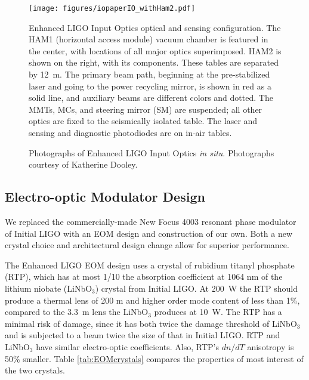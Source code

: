 \begin{figure}
\begin{centering}
\texttt{[image: figures/iopaperIO\_withHam2.pdf]}
\caption[Enhanced LIGO Input Optics optical and sensing
  configuration]{Enhanced LIGO Input Optics optical and sensing
  configuration. The HAM1 (horizontal access module) vacuum chamber is
  featured in the center, with locations of all major optics
  superimposed. HAM2 is shown on the right, with its components. These
  tables are separated by 12~m. The primary beam path, beginning at
  the pre-stabilized laser and going to the power recycling mirror, is
  shown in red as a solid line, and auxiliary beams are different
  colors and dotted. The MMTs, MCs, and steering mirror (SM) are
  suspended; all other optics are fixed to the seismically isolated
  table. The laser and sensing and diagnostic photodiodes are on
  in-air tables.}
\label{fig:IOschematic}
\end{centering}
\end{figure}

\begin{figure}
\begin{centering}
\caption[Photographs of Enhanced LIGO Input
Optics \emph{in situ}]{Photographs of Enhanced LIGO Input Optics
  \emph{in situ}. Photographs courtesy of Katherine Dooley.} %
\label{fig:IOpictures}
\end{centering}
\end{figure}


\subsection{Electro-optic Modulator Design}
We replaced the commercially-made New Focus 4003 resonant phase
modulator of Initial LIGO with an EOM design and construction of our
own. Both a new crystal choice and architectural design change allow
for superior performance.

The Enhanced LIGO EOM design uses a crystal of rubidium titanyl
phosphate (RTP), which has at most 1/10 the absorption coefficient at
1064 nm of the lithium niobate (LiNbO$_3$) crystal from Initial
LIGO. At 200~W the RTP should produce a thermal lens of 200 m and
higher order mode content of less than 1\%, compared to the 3.3~m lens
the LiNbO$_3$ produces at 10~W. The RTP has a minimal risk of damage,
since it has both twice the damage threshold of LiNbO$_3$ and is
subjected to a beam twice the size of that in Initial LIGO. RTP and
LiNbO$_3$ have similar electro-optic coefficients. Also, RTP's $dn/dT$
anisotropy is 50\% smaller. Table \ref{tab:EOMcrystals} compares the
properties of most interest of the two crystals.


